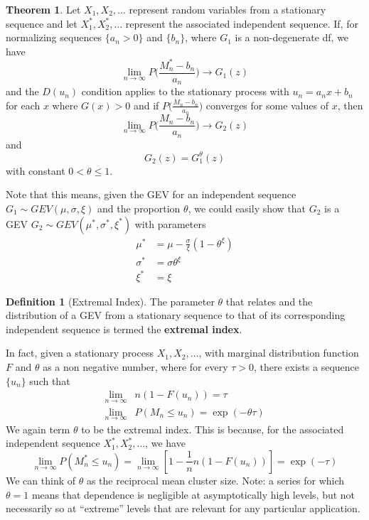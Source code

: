 \documentclass{article}
\theoremstyle{definition}
\newtheorem{theorem}{Theorem}
\theoremstyle{definition}
\newtheorem{definition}{Definition}
\begin{document}
\begin{theorem}
Let $X_1, X_2, \hdots$ represent random variables from a stationary sequence and let $X^*_1, X^*_2, \hdots$ represent the associated independent sequence. If, for normalizing sequences $\{a_n > 0\}$ and
$\{b_n\}$, where $G_1$ is a non-degenerate df, we have 
\[\lim_{n \rightarrow \infty}P \bigg( \frac{M_n^*-b_n}{a_n} \bigg)\rightarrow G_1(z)\]
and the $D(u_n)$ condition applies to the stationary process with $u_n= a_nx+b_n$ for each $x$ where $G(x)>0$ and if $P \bigg( \frac{M_n-b_n}{a_n} \bigg)$ converges for some values of $x$, then 
\[\lim_{n \rightarrow \infty}P \bigg( \frac{M_n-b_n}{a_n} \bigg)\rightarrow G_2(z)\]
and
\[G_2(z)=G_1^\theta(z)\]
with constant $0<\theta\leq 1$.

\noindent Note that this means, given the GEV for an independent sequence $G_1\sim GEV(\mu, \sigma,\xi)$ and the proportion $\theta$, we could easily show that $G_2$ is a GEV $G_2\sim GEV(\mu^*, \sigma^*, \xi^*)$ with parameters 
\begin{align*}
    \mu^*&= \mu-\frac{\sigma}{\xi}(1-\theta^\xi)\\
    \sigma^*&=\sigma\theta^\xi\\
    \xi^*&=\xi
\end{align*}
\end{theorem}
\begin{definition}[Extremal Index]
The parameter $\theta$ that relates and the distribution of a GEV from a stationary sequence to that of its corresponding independent sequence is termed the \textbf{extremal index}.

In fact, given a stationary process $X_1, X_2, \hdots$, with marginal distribution function $F$ and $\theta$ as a non negative number, where for every $\tau>0$, there exists a sequence $\{u_n\}$ such that 
\begin{align*}
    \lim_{n\rightarrow \infty}& n(1-F(u_n))=\tau\\
    \lim_{n\rightarrow \infty}& P(M_n\leq u_n)= \exp(-\theta\tau)
\end{align*}
We again term $\theta$ to be the extremal index. This is because, for the associated independent sequence $X_1^*, X_2^*, \hdots$, we have
\[
\lim_{n\rightarrow\infty} P(M_n^*\leq u_n) =\lim_{n\rightarrow\infty}[1-\frac{1}{n}n(1-F(u_n))]= \exp(-\tau) \]
We can think of $\theta$ as the reciprocal mean cluster size. Note: a series for which $\theta = 1$ means that dependence is negligible at asymptotically high levels, but not necessarily so at “extreme” levels that are relevant for any particular application.
\end{definition}
\end{document}
